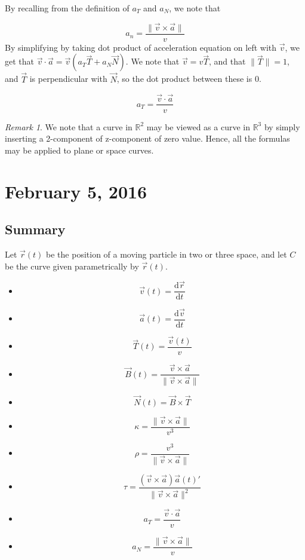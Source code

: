 \documentclass[11pt]{article}
\theoremstyle{plain} %
\theoremstyle{definition}
\theoremstyle{example}
\theoremstyle{remark}
\newtheorem*{remark}{Remark}
\begin{document}
By recalling from the definition of $a_T$ and $a_N$, we note that

$$a_n = \frac{\|\vec{v}\times\vec{a}\|}{v}$$
By simplifying by taking dot product of acceleration equation on left with $\vec{v}$, we get that $\vec{v} \cdot \vec{a} = \vec{v}\left(  a_T \vec{T} + a_N\vec{N} \right)$. We note that $\vec{v} = v\vec{T}$, and that $\|\vec{T}\| = 1$, and $\vec{T}$ is perpendicular with $\vec{N}$, so the dot product between these is 0.

$$a_T = \frac{\vec{v} \cdot \vec{a}}{v}$$

\begin{remark}We note that a curve in $\mathbb R^2$ may be viewed as a curve in $\mathbb R^3$ by simply inserting a 2-component of z-component of zero value. Hence, all the formulas may be applied to plane or space curves. 
\end{remark}
























\section{February 5, 2016}
\subsection{ Summary}

Let $\vec{r}(t)$ be the position of a moving particle in two or three space, and let $C$ be the curve given parametrically by $\vec{r}(t)$. 
\begin{itemize}
	\item $$\vec{v}(t) = \frac{\mathrm d \vec{r}}{\mathrm d t}$$
	\item $$\vec{a}(t) = \frac{\mathrm d \vec{v}}{\mathrm d t}$$
	\item $$\vec{T}(t) = \frac{\vec{v}(t)}{v}$$
	\item $$\vec{B}(t) = \frac{\vec{v} \times \vec{a}}{\|   \vec{v} \times \vec{a}    \|}$$
	\item $$ \vec{N}(t) = \vec{B} \times \vec{T}$$
	\item $$\kappa = \frac{\| \vec{v} \times \vec{a}\|}{v^3}$$
	\item $$\rho = \frac{v^3}{\| \vec{v} \times \vec{a} \|}$$
	\item $$\tau = \frac{(\vec{v} \times \vec{a})\vec{a}(t)'}{\|\vec{v}\times \vec{a}\|^2}$$
	\item $$a_T = \frac{\vec{v} \cdot \vec{a}}{v}$$
	\item $$a_N = \frac{\|\vec{v}\times\vec{a}\|}{v}$$
\end{itemize}
\end{document}
